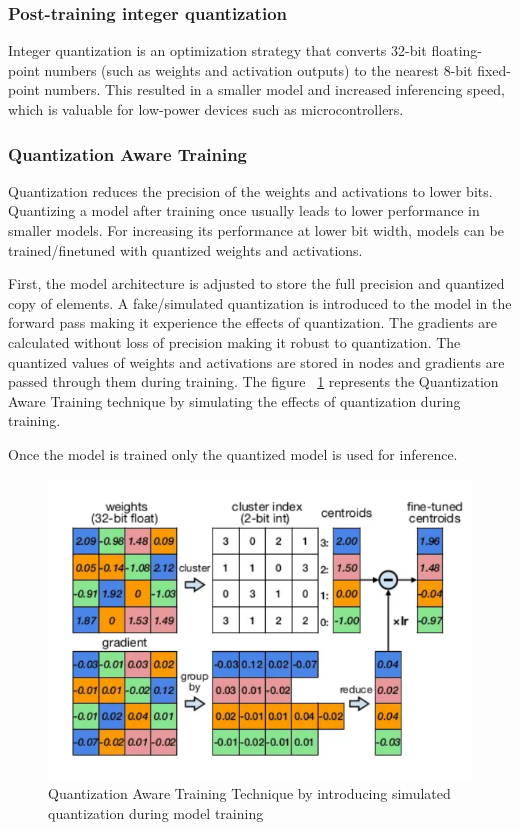 \subsubsection{Post-training integer quantization}
Integer quantization is an optimization strategy that converts 32-bit floating-point numbers (such as weights and activation outputs) to the nearest 8-bit fixed-point numbers. This resulted in a smaller model and increased inferencing speed, which is valuable for low-power devices such as microcontrollers. \cite{opencvtensorflow:2023} \cite{tfl_Opt:2024}

\subsubsection{Quantization Aware Training}
Quantization reduces the precision of the weights and activations to lower bits. Quantizing a model after training once usually leads to lower performance in smaller models. For increasing its performance at lower bit width, models can be trained/finetuned with quantized weights and activations.

First, the model architecture is adjusted to store the full precision and quantized copy of elements. A fake/simulated quantization is introduced to the model in the forward pass making it experience the effects of quantization.
The gradients are calculated without loss of precision making it robust to quantization. The quantized values of weights and activations are stored in nodes and gradients are passed through them during training. The figure ~\ref{QuantizationAwareTraining} represents the Quantization Aware Training technique by simulating the effects of quantization during training.

Once the model is trained only the quantized model is used for inference. \cite{MediumQuantAware:2024}

\begin{figure}
	\begin{center}
		\includegraphics[width=0.7\linewidth]{Images/TensorFlowLite/QuantizationAwareTraining.png}
		\caption{Quantization Aware Training Technique by introducing simulated quantization during model training}
		\label{QuantizationAwareTraining}
	\end{center}
\end{figure}

